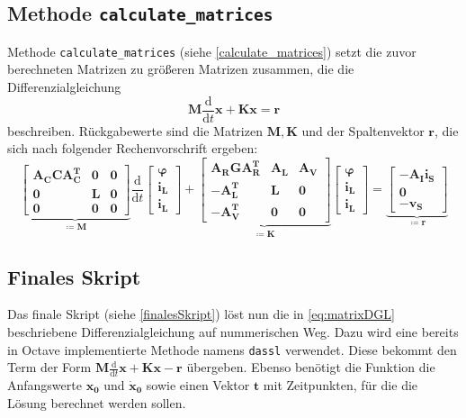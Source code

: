 \subsection*{Methode \texttt{calculate\_matrices}}
	Methode \texttt{calculate\_matrices} (siehe \ref{calculate_matrices}) setzt die zuvor berechneten Matrizen zu größeren Matrizen zusammen, die die Differenzialgleichung
	\begin{equation}
	\mathbf{M} \frac{\text{d}}{\text{d}t} \mathbf{x} + \mathbf{K} \mathbf{x} = \mathbf{r}
	\label{eq:matrixDGL}
	\end{equation}
	beschreiben. Rückgabewerte sind die Matrizen $\mathbf{M, K}$ und der Spaltenvektor $\mathbf{r}$, die sich nach folgender Rechenvorschrift ergeben:
	\begin{equation}
	\underbrace{
		\begin{bmatrix}
			\mathbf{A_C C A_C^T} & \mathbf{0} & \mathbf{0}\\
			\mathbf{0} & \mathbf{L} & \mathbf{0}\\
			\mathbf{0} & \mathbf{0} & \mathbf{0}
		\end{bmatrix}
	}_{\coloneqq \mathbf{M}}
	\frac{\text{d}}{\text{d}t}
	\begin{bmatrix}
		\boldsymbol{\varphi}\\
		\mathbf{i_L}\\
		\mathbf{i_L}
	\end{bmatrix}
	+
	\underbrace{
		\begin{bmatrix}
		\mathbf{A_R G A_R^T} & \mathbf{A_L} & \mathbf{A_V}\\
		-\mathbf{A_L^T} & \mathbf{L} & \mathbf{0}\\
		-\mathbf{A_V^T} & \mathbf{0} & \mathbf{0}
		\end{bmatrix}
	}_{\coloneqq \mathbf{K}}
	\begin{bmatrix}
	\boldsymbol{\varphi}\\
	\mathbf{i_L}\\
	\mathbf{i_L}
	\end{bmatrix}
	=
	\underbrace{
		\begin{bmatrix}
			-\mathbf{A_I i_S}\\
			\mathbf{0}\\
			-\mathbf{v_S}
		\end{bmatrix}
	}_{\coloneqq \mathbf{r}}
	\end{equation}
	\newpage

\subsection*{Finales Skript}	
	Das finale Skript (siehe \ref{finalesSkript}) löst nun die in \ref{eq:matrixDGL} beschriebene Differenzialgleichung auf nummerischen Weg. Dazu wird eine bereits in Octave implementierte Methode namens \texttt{dassl} verwendet. Diese bekommt den Term der Form $\mathbf{M} \frac{\text{d}}{\text{d}t} \mathbf{x} + \mathbf{K} \mathbf{x} - \mathbf{r}$ übergeben. Ebenso benötigt die Funktion die Anfangswerte $\mathbf{x_0}$ und $\mathbf{\dot{x}_0}$ sowie einen Vektor $\mathbf{t}$ mit Zeitpunkten, für die die Lösung berechnet werden sollen.

